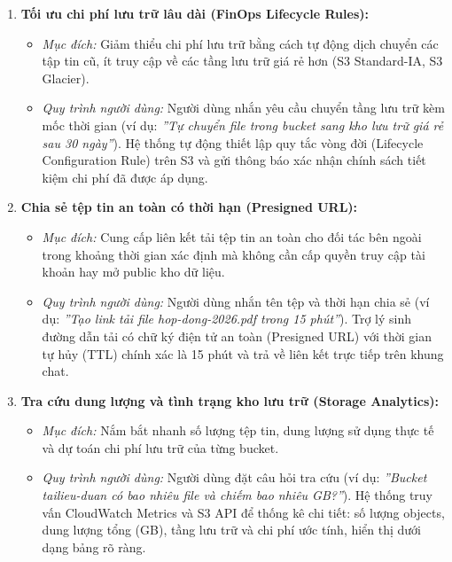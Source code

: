 \documentclass[a4paper,12pt]{article}
\begin{document}
\begin{enumerate}
  \item \textbf{Tối ưu chi phí lưu trữ lâu dài (FinOps Lifecycle Rules):}
  \begin{itemize}
    \item \textit{Mục đích:} Giảm thiểu chi phí lưu trữ bằng cách tự động dịch chuyển các tập tin cũ, ít truy cập về các tầng lưu trữ giá rẻ hơn (S3 Standard-IA, S3 Glacier).
    \item \textit{Quy trình người dùng:} Người dùng nhắn yêu cầu chuyển tầng lưu trữ kèm mốc thời gian (ví dụ: \textit{''Tự chuyển file trong bucket sang kho lưu trữ giá rẻ sau 30 ngày''}). Hệ thống tự động thiết lập quy tắc vòng đời (Lifecycle Configuration Rule) trên S3 và gửi thông báo xác nhận chính sách tiết kiệm chi phí đã được áp dụng.
  \end{itemize}

  \item \textbf{Chia sẻ tệp tin an toàn có thời hạn (Presigned URL):}
  \begin{itemize}
    \item \textit{Mục đích:} Cung cấp liên kết tải tệp tin an toàn cho đối tác bên ngoài trong khoảng thời gian xác định mà không cần cấp quyền truy cập tài khoản hay mở public kho dữ liệu.
    \item \textit{Quy trình người dùng:} Người dùng nhắn tên tệp và thời hạn chia sẻ (ví dụ: \textit{''Tạo link tải file hop-dong-2026.pdf trong 15 phút''}). Trợ lý sinh đường dẫn tải có chữ ký điện tử an toàn (Presigned URL) với thời gian tự hủy (TTL) chính xác là 15 phút và trả về liên kết trực tiếp trên khung chat.
  \end{itemize}

  \item \textbf{Tra cứu dung lượng và tình trạng kho lưu trữ (Storage Analytics):}
  \begin{itemize}
    \item \textit{Mục đích:} Nắm bắt nhanh số lượng tệp tin, dung lượng sử dụng thực tế và dự toán chi phí lưu trữ của từng bucket.
    \item \textit{Quy trình người dùng:} Người dùng đặt câu hỏi tra cứu (ví dụ: \textit{''Bucket tailieu-duan có bao nhiêu file và chiếm bao nhiêu GB?''}). Hệ thống truy vấn CloudWatch Metrics và S3 API để thống kê chi tiết: số lượng objects, dung lượng tổng (GB), tầng lưu trữ và chi phí ước tính, hiển thị dưới dạng bảng rõ ràng.
  \end{itemize}
\end{enumerate}
\end{document}
